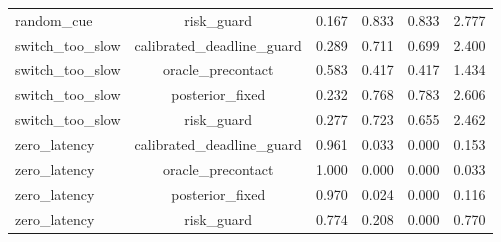 \begin{table}[t]
\begin{tabular}{lccccc}
random\_cue & risk\_guard & 0.167 & 0.833 & 0.833 & 2.777 \\
switch\_too\_slow & calibrated\_deadline\_guard & 0.289 & 0.711 & 0.699 & 2.400 \\
switch\_too\_slow & oracle\_precontact & 0.583 & 0.417 & 0.417 & 1.434 \\
switch\_too\_slow & posterior\_fixed & 0.232 & 0.768 & 0.783 & 2.606 \\
switch\_too\_slow & risk\_guard & 0.277 & 0.723 & 0.655 & 2.462 \\
zero\_latency & calibrated\_deadline\_guard & 0.961 & 0.033 & 0.000 & 0.153 \\
zero\_latency & oracle\_precontact & 1.000 & 0.000 & 0.000 & 0.033 \\
zero\_latency & posterior\_fixed & 0.970 & 0.024 & 0.000 & 0.116 \\
zero\_latency & risk\_guard & 0.774 & 0.208 & 0.000 & 0.770 \\
\bottomrule
\end{tabular}
\end{table}
